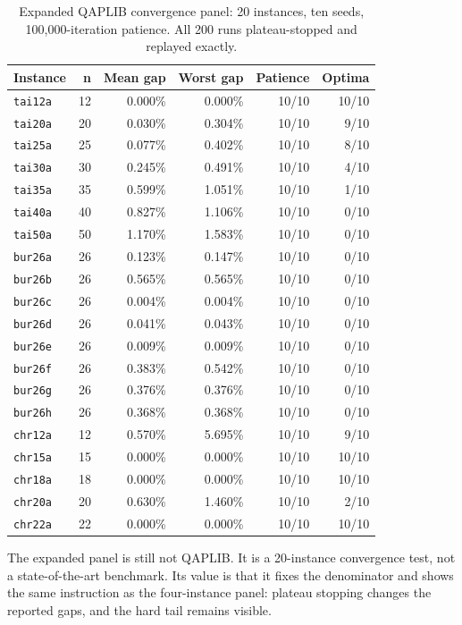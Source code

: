\documentclass[11pt]{article}
\begin{document}
\begin{table}[t]
\centering
\caption{Expanded QAPLIB convergence panel: 20 instances, ten seeds, 100,000-iteration patience.
All 200 runs plateau-stopped and replayed exactly.}
\label{tab:qap-expanded}
\small
\begin{tabular}{lrrrrr}
\toprule
Instance & n & Mean gap & Worst gap & Patience & Optima \\
\midrule
\texttt{tai12a} & 12 & 0.000\% & 0.000\% & 10/10 & 10/10 \\
\texttt{tai20a} & 20 & 0.030\% & 0.304\% & 10/10 & 9/10 \\
\texttt{tai25a} & 25 & 0.077\% & 0.402\% & 10/10 & 8/10 \\
\texttt{tai30a} & 30 & 0.245\% & 0.491\% & 10/10 & 4/10 \\
\texttt{tai35a} & 35 & 0.599\% & 1.051\% & 10/10 & 1/10 \\
\texttt{tai40a} & 40 & 0.827\% & 1.106\% & 10/10 & 0/10 \\
\texttt{tai50a} & 50 & 1.170\% & 1.583\% & 10/10 & 0/10 \\
\texttt{bur26a} & 26 & 0.123\% & 0.147\% & 10/10 & 0/10 \\
\texttt{bur26b} & 26 & 0.565\% & 0.565\% & 10/10 & 0/10 \\
\texttt{bur26c} & 26 & 0.004\% & 0.004\% & 10/10 & 0/10 \\
\texttt{bur26d} & 26 & 0.041\% & 0.043\% & 10/10 & 0/10 \\
\texttt{bur26e} & 26 & 0.009\% & 0.009\% & 10/10 & 0/10 \\
\texttt{bur26f} & 26 & 0.383\% & 0.542\% & 10/10 & 0/10 \\
\texttt{bur26g} & 26 & 0.376\% & 0.376\% & 10/10 & 0/10 \\
\texttt{bur26h} & 26 & 0.368\% & 0.368\% & 10/10 & 0/10 \\
\texttt{chr12a} & 12 & 0.570\% & 5.695\% & 10/10 & 9/10 \\
\texttt{chr15a} & 15 & 0.000\% & 0.000\% & 10/10 & 10/10 \\
\texttt{chr18a} & 18 & 0.000\% & 0.000\% & 10/10 & 10/10 \\
\texttt{chr20a} & 20 & 0.630\% & 1.460\% & 10/10 & 2/10 \\
\texttt{chr22a} & 22 & 0.000\% & 0.000\% & 10/10 & 10/10 \\
\bottomrule
\end{tabular}
\end{table}

The expanded panel is still not QAPLIB. It is a 20-instance convergence test, not a state-of-the-art
benchmark. Its value is that it fixes the denominator and shows the same instruction as the
four-instance panel: plateau stopping changes the reported gaps, and the hard tail remains visible.
\end{document}
